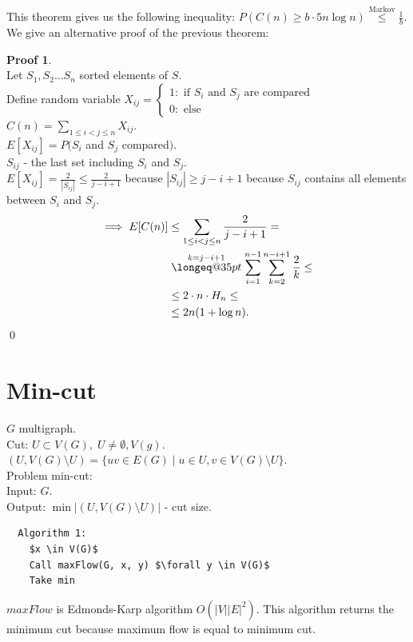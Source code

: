 \documentclass[a4paper, 12pt]{book}
\makeatletter
\theoremstyle{definition}
\newtheorem{pro}[counter]{Proof}
\theoremstyle{remark}
\newcommand{\longeq}[1]{\mathrel{\mathpalette\longeq@{#1}}}
\newcommand{\longeq@}[2]{%
  \begingroup
  \sbox\z@{$\m@th#1=$}%
  \ifdim#2<\wd\z@
    \resizebox{#2}{\height}{\box\z@}%
  \else
    \ifdim#2<3\wd\z@
      \hbox to #2{$\m@th#1=\hss=\hss=\hss=$}%
    \else
      \hbox to #2{$\m@th#1=\cleaders\hbox to 0.2\wd\z@{\hss$#1=$\hss}\hfil=$}%
    \fi
  \fi
  \endgroup
}
\makeatother
\begin{document}
This theorem gives us the following inequality: $P\left(C(n) \geq b \cdot 5n \log n\right) \stackrel{\text{Markov}}{\leq} \frac{1}{b}$.
We give an alternative proof of the previous theorem:
\begin{pro} \text{} \\
  Let $S_1, S_2 \dots S_n$ sorted elements of $S$. \\
  Define random variable
  $X_{ij} = \begin{cases}
    1: \text{ if $S_i$ and $S_j$ are compared} \\
    0: \text{ else}
  \end{cases}$ \\
  $C(n) = \sum_{1 \leq i < j \leq n}X_{ij}$. \\
  $E[X_{ij}] = P(S_i$ and $S_j$ compared$)$. \\
  $S_{ij}$ - the last set including $S_i$ and $S_j$. \\
  $E[X_{ij}] = \frac{2}{|S_{ij}|} \leq \frac{2}{j-i+1}$ because $|S_{ij}| \geq j - i + 1$ because $S_{ij}$ contains all elements between $S_i$ and $S_j$. \\
  \begin{align*}
    \implies E[C(n)] &\leq \sum_{1 \leq i < j \leq n} \frac{2}{j-i+1} = \\
    &\stackrel{k=j-i+1}{\longeq{35pt}} \sum_{i=1}^{n-1} \sum_{k=2}^{n-i+1} \frac{2}{k} \leq \\
    &\leq 2 \cdot n \cdot H_n \leq \\
    &\leq 2 n (1 + \log n).
  \end{align*}
  \qed
\end{pro}



\section{Min-cut}

$G$ multigraph. \\
Cut: $U \subset V(G), \; U \neq \emptyset, V(g)$. \\
$(U, V(G) \setminus U) = \{uv \in E(G) \mid u \in U, v \in V(G) \setminus U\}$. \\
Problem min-cut: \\
Input: $G$. \\
Output: $\min |(U, V(G) \setminus U)|$ - cut size.
\begin{lstlisting}
  Algorithm 1:
    $x \in V(G)$
    Call maxFlow(G, x, y) $\forall y \in V(G)$
    Take min
\end{lstlisting}
$maxFlow$ is Edmonds-Karp algorithm $O\left(|V| |E|^2\right)$.
This algorithm returns the minimum cut because maximum flow is equal to minimum cut. 
\end{document}

